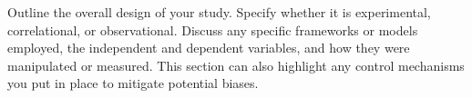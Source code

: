 Outline the overall design of your study. Specify whether it is experimental, correlational, or observational. Discuss any specific frameworks or models employed, the independent and dependent variables, and how they were manipulated or measured. This section can also highlight any control mechanisms you put in place to mitigate potential biases.